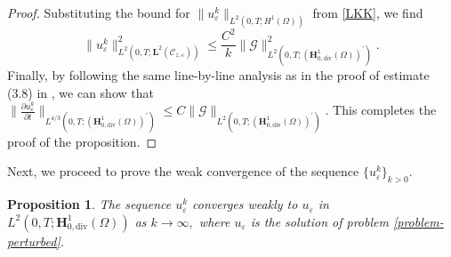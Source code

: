 \documentclass[a4paper,12pt,reqno,natbib]{amsart}
\newtheorem{proposition}[theorem]{Proposition}
\def\H{\textbf{H}}
\def\L{\textbf{L}}
\def\div{\text{div}}
\begin{document}
\begin{proof}
Substituting the bound for $\big\|u_\varepsilon^k\big\|_{L^2(0,T;H^1(\Omega))}$ from \eqref{LKK}, we find
\begin{equation*}
\big\|u_\varepsilon^k\big\|^2_{L^2(0,T;\L^2(\mathcal{C}_{z,\varepsilon}))}\leq \frac{C^2}{k}\big\|\mathcal{G}\big\|^2_{L^2(0,T;(\H^1_{0,\div}(\Omega))^\prime)}.
\end{equation*}
Finally, by following the same line-by-line analysis as in the proof of estimate (3.8) in \cite{pokorny2022navier}, we can show that $\big\|\frac{\partial u_\varepsilon^k}{\partial t}\big\|_{L^{4/3}(0,T;(\H^1_{0,\text{div}}(\Omega))^\prime)}\leq C  \big\| \mathcal{G} \big\|_{L^2(0,T;(\H^1_{0,\div}(\Omega))^\prime)}$. This completes the proof of the proposition.
\end{proof}


Next, we proceed to prove the weak convergence of the sequence $\{u_\varepsilon^k\}_{k>0}$.

\begin{proposition} \label{con-pro}The sequence $u_\varepsilon^k$ converges weakly to $u_\varepsilon$ in  $L^2(0,T;\H^1_{0,\div}(\Omega))$ as $k\longrightarrow\infty,$ where \( u_\varepsilon \) is the solution of problem \eqref{problem-perturbed}.
\end{proposition}
\end{document}
